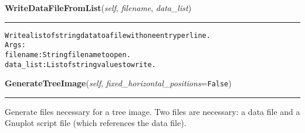 \hspace{.8\funcindent}\begin{boxedminipage}{\funcwidth}

    \raggedright \textbf{WriteDataFileFromList}(\textit{self}, \textit{filename}, \textit{data\_list})

    \vspace{-1.5ex}

    \rule{\textwidth}{0.5\fboxrule}
\setlength{\parskip}{2ex}
\begin{alltt}

Write a list of string data to a file with one entry per line.
Args:
  filename: String filename to open.
  data\_list: List of string values to write.
\end{alltt}

\setlength{\parskip}{1ex}
    \end{boxedminipage}

    \label{coinor:grumpy:BB:BBTree:GenerateTreeImage}

    \vspace{0.5ex}

\hspace{.8\funcindent}\begin{boxedminipage}{\funcwidth}

    \raggedright \textbf{GenerateTreeImage}(\textit{self}, \textit{fixed\_horizontal\_positions}={\tt False})

    \vspace{-1.5ex}

    \rule{\textwidth}{0.5\fboxrule}
\setlength{\parskip}{2ex}
    Generate files necessary for a tree image. Two files are necessary: a 
    data file and a Gnuplot script file (which references the data file).

\setlength{\parskip}{1ex}
    \end{boxedminipage}

    \label{coinor:grumpy:BB:BBTree:ProcessLine}

    \vspace{0.5ex}

